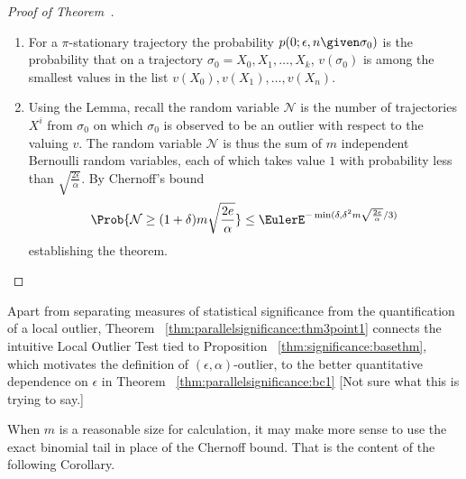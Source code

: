 \documentclass[12pt]{article}
\begin{document}
\begin{proof}[Proof of Theorem~\ref
    {thm:parallelsignificance:thm3point1}]
    \begin{enumerate}
        \item
            For a \( \pi \)-stationary trajectory the probability \( p(0;
            \epsilon, n \given \sigma_0) \) is the probability that on a
            trajectory \( \sigma_0 = X_0, X_1, \dots, X_k \), \( v(\sigma_0)
            \) is among the smallest values in the list \( v(X_0), v(X_1),
            \dots, v(X_n) \).
        \item
            Using the Lemma, recall the random variable \( \mathcal{N} \)
            is the number of trajectories \( X^i \) from \( \sigma_0 \)
            on which \( \sigma_0 \) is observed to be an outlier with
            respect to the valuing \( v \).  The random variable \(
            \mathcal{N} \) is thus the sum of \( m \) independent
            Bernoulli random variables, each of which takes value \( 1 \)
            with probability less than \( \sqrt{\frac{2 \epsilon}{\alpha}}
            \).  By Chernoff's bound
            \[
                \Prob{\mathcal{N} \ge (1 + \delta) m \sqrt{\frac{2e}{\alpha}}
                } \le \EulerE^{ -\min (\delta, \delta^2 m \sqrt{\frac{2e}
                {\alpha}}/3)}
            \] establishing the theorem.
    \end{enumerate}
\end{proof}

\begin{remark}
    Apart from separating measures of statistical significance from the
    quantification of a local outlier, Theorem~%
    \ref{thm:parallelsignificance:thm3point1} connects the intuitive
    Local Outlier Test tied to Proposition~%
    \ref{thm:significance:basethm}, which motivates the definition of \(
    (\epsilon, \alpha) \)-outlier, to the better quantitative dependence
    on \( \epsilon \) in Theorem~%
    \ref{thm:parallelsignificance:bc1} [Not sure what this is trying to
    say.]
\end{remark}

\begin{remark}
    When \( m \) is a reasonable size for calculation, it may make more
    sense to use the exact binomial tail in place of the Chernoff bound.
    That is the content of the following Corollary.
\end{remark}
\end{document}
